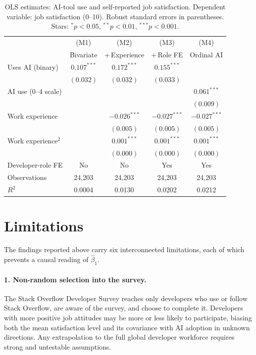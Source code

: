 \documentclass[11pt]{article}
\begin{document}
\begin{table}[h]
\centering
\caption{OLS estimates: AI-tool use and self-reported job satisfaction.
  Dependent variable: job satisfaction (0--10). Robust standard errors in
  parentheses. Stars: $^{*}p<0.05$, $^{**}p<0.01$, $^{***}p<0.001$.}
\label{tab:regs}
\smallskip
\begin{tabular}{lcccc}
\toprule
 & (M1) & (M2) & (M3) & (M4) \\
 & Bivariate & +\,Experience & +\,Role FE & Ordinal AI \\
\midrule
Uses AI (binary)     & $0.107^{***}$ & $0.172^{***}$ & $0.155^{***}$ &  \\
                     & $(0.032)$     & $(0.032)$     & $(0.033)$     &  \\[4pt]
AI use (0--4 scale)  &               &               &               & $0.061^{***}$ \\
                     &               &               &               & $(0.009)$ \\[4pt]
Work experience      &  & $-0.026^{***}$ & $-0.027^{***}$ & $-0.027^{***}$ \\
                     &  & $(0.005)$      & $(0.005)$      & $(0.005)$ \\[4pt]
Work experience$^{2}$&  & $0.001^{***}$ & $0.001^{***}$ & $0.001^{***}$ \\
                     &  & $(0.000)$     & $(0.000)$     & $(0.000)$ \\[4pt]
Developer-role FE    & No & No & Yes & Yes \\
\midrule
Observations         & 24,203 & 24,203 & 24,203 & 24,203 \\
$R^{2}$              & 0.0004 & 0.0130 & 0.0202 & 0.0212 \\
\bottomrule
\end{tabular}
\end{table}

\section{Limitations}

The findings reported above carry six interconnected limitations, each of
which prevents a causal reading of $\hat\beta_{1}$.

\paragraph{1. Non-random selection into the survey.}
The Stack Overflow Developer Survey reaches only developers who use or follow
Stack Overflow, are aware of the survey, and choose to complete it.
Developers with more positive job attitudes may be more or less likely to
participate, biasing both the mean satisfaction level and its covariance with
AI adoption in unknown directions. Any extrapolation to the full global
developer workforce requires strong and untestable assumptions.
\end{document}
